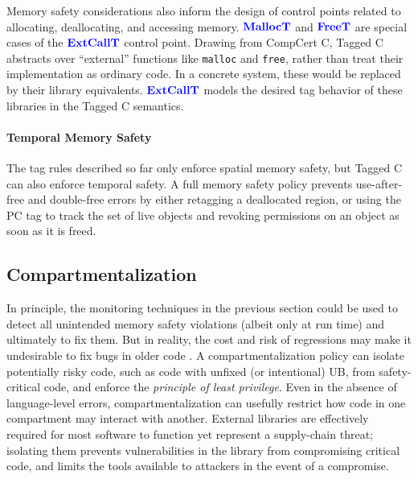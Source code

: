 \documentclass{llncs}
\begin{document}
Memory safety considerations also inform the design of control points related to allocating, deallocating, and
accessing memory. \(\color{blue} \mathbf{MallocT}\) and \(\color{blue} \mathbf{FreeT}\) are special cases of the
\(\color{blue} \mathbf{ExtCallT}\) control point. 
Drawing from CompCert C, Tagged C abstracts over
``external'' functions like {\tt malloc} and {\tt free}, rather than treat their implementation as
ordinary code. In a concrete system, these would be replaced by their library equivalents. 
\(\color{blue} \mathbf{ExtCallT}\) models the desired tag behavior of these libraries in the Tagged C semantics.

\paragraph*{Temporal Memory Safety}

The tag rules described so far only enforce spatial memory safety, but Tagged C can 
also enforce temporal safety. A full memory safety policy prevents use-after-free and
double-free errors by either retagging a deallocated region, or using the PC tag
to track the set of live objects and revoking permissions on an object as soon as it is freed.

\subsection{Compartmentalization}
\label{sec:compartments}

In principle, the monitoring techniques in the previous section could be used
to detect all unintended memory safety violations (albeit only at run time) and ultimately to fix them.
But in reality, the cost and risk of regressions may make it
undesirable to fix bugs in older code \cite{Bessey10:Coverity}.  
%
A compartmentalization policy can isolate potentially risky code, such as code with unfixed
(or intentional) UB, from safety-critical code, and enforce the {\em principle of least privilege}. 
Even in the absence of language-level errors, compartmentalization can usefully 
restrict how code in one compartment may interact with another. External libraries are
effectively required for most software to function yet represent a supply-chain threat; isolating 
them prevents vulnerabilities in the library from compromising critical code,
and limits the tools available to attackers in the event of a compromise.
\end{document}
